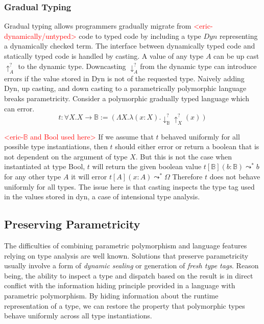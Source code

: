 \documentclass[acmsmall]{acmart}
\newcommand{\eric}[1]{\textcolor{red}{ <eric-#1> }}
\begin{document}
\subsubsection{Gradual Typing}
Gradual typing allows programmers gradually migrate from \eric{dynamically/untyped} code to typed code by including a type $Dyn$ representing a dynamically checked term. 
The interface between dynamically typed code and statically typed code is handled by casting.
A value of any type $A$ can be up cast $\uparrow_A^?$ to the dynamic type.
Downcasting $\downarrow_A^?$from the dynamic type can introduce errors if the value stored in Dyn is not of the requested type.
Naively adding Dyn, up casting, and down casting to a parametrically polymorphic language breaks parametricity. 
Consider a polymorphic gradually typed language which can error.
$$t : \forall X. X \rightarrow \mathbb{B}:= (\Lambda X. \lambda (x : X). \downarrow_\mathbb{B}^?\uparrow_X^?(x))$$

\eric{$\mathbb{B}$ and Bool used here}
If we assume that $t$ behaved uniformly for all possible type instantiations, then $t$ should either error
or return a boolean that is not dependent on the argument of type $X$.
But this is not the case
when instantiated at type Bool, $t$ will return the given boolean value
$t[\mathbb{B}](b : \mathbb{B}) \leadsto^* b$ for any other type $A$ it will error
$t[A](x:A)\leadsto^* \Omega$
Therefore $t$ does not behave uniformly for all types. 
The issue here is that casting inspects the type tag used in the values stored in dyn, a case of intensional type analysis.

\subsection{Preserving Parametricity}

The difficulties of combining parametric polymorphism and language features relying on type analysis are well known\cite{NonParam}\cite{GradParam}\cite{ToroGradParam}\cite{ForFreeForFree}.
Solutions that preserve parametricity usually involve a form of \textit{dynamic sealing} or generation of \textit{fresh type tags}. Reason being, the ability to inspect a type and dispatch based on the result is in direct conflict with the information hiding principle provided in a language with parametric polymorphism. By hiding information about the runtime representation of a type, we can restore the property that polymorphic types behave uniformly across all type instantiations.
\end{document}
